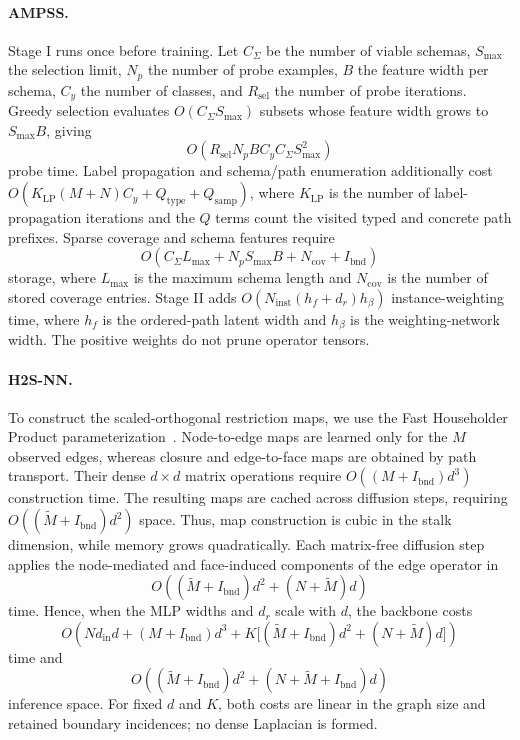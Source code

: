 \documentclass[sigconf,anonymous,review]{acmart}
\newcommand{\method}{\textsc{H2S-NN}}
\newcommand{\ampss}{\textsc{AMPSS}}
\begin{document}
\paragraph{\ampss{}.}
Stage I runs once before training. Let \(C_\Sigma\) be the number of viable
schemas, \(S_{\max}\) the selection limit, \(N_p\) the number of probe examples,
\(B\) the feature width per schema, \(C_y\) the number of classes, and \(R_{\mathrm{sel}}\)
the number of probe iterations. Greedy selection evaluates
\(O(C_\Sigma S_{\max})\) subsets whose feature width grows to \(S_{\max}B\), giving
\[
O(R_{\mathrm{sel}}N_pBC_yC_\Sigma S_{\max}^2)
\]
probe time. Label propagation and schema/path enumeration additionally cost
\(O(K_{\mathrm{LP}}(M+N)C_y+Q_{\mathrm{type}}+Q_{\mathrm{samp}})\), where
\(K_{\mathrm{LP}}\) is the number of label-propagation iterations and the \(Q\) terms
count the visited typed and concrete path prefixes. Sparse coverage and
schema features require
\[
O(C_\Sigma L_{\max}+N_pS_{\max}B+N_{\mathrm{cov}}+I_{\mathrm{bnd}})
\]
storage, where \(L_{\max}\) is the maximum schema length and \(N_{\mathrm{cov}}\) is the
number of stored coverage entries. Stage II adds
\(O(N_{\mathrm{inst}}(h_f+d_r)h_\beta)\) instance-weighting time, where \(h_f\) is the
ordered-path latent width and \(h_\beta\) is the weighting-network width. The positive weights
do not prune operator tensors.

\paragraph{\method{}.}
To construct the scaled-orthogonal restriction maps, we use the Fast
Householder Product parameterization~\cite{mathiasen2020fasth}. Node-to-edge
maps are learned only for the \(M\) observed edges, whereas closure and
edge-to-face maps are obtained by path transport. Their dense
\(d\times d\) matrix operations require \(O((M+I_{\mathrm{bnd}})d^3)\) construction time.
The resulting maps are cached across diffusion steps, requiring
\(O((\widetilde M+I_{\mathrm{bnd}})d^2)\) space. Thus, map construction is cubic in the
stalk dimension, while memory grows quadratically.
Each matrix-free diffusion step applies the node-mediated and face-induced
components of the edge operator in
\[
O\!\left((\widetilde M+I_{\mathrm{bnd}})d^2+(N+\widetilde M)d\right)
\]
time. Hence, when the MLP widths and \(d_r\) scale with \(d\), the backbone
costs
\[
O\!\left(
Nd_{\mathrm{in}}d+(M+I_{\mathrm{bnd}})d^3
+K\bigl[(\widetilde M+I_{\mathrm{bnd}})d^2+(N+\widetilde M)d\bigr]
\right)
\]
time and
\[
O\!\left((\widetilde M+I_{\mathrm{bnd}})d^2+(N+\widetilde M+I_{\mathrm{bnd}})d\right)
\]
inference space. For fixed \(d\) and \(K\), both costs are linear in the
graph size and retained boundary incidences; no dense Laplacian is formed.
\end{document}
